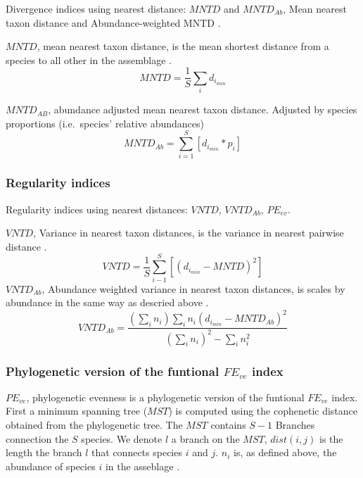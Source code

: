 \documentclass[]{book}
\theoremstyle{definition}
\theoremstyle{definition}
\theoremstyle{definition}
\theoremstyle{remark}
\begin{document}
Divergence indices using nearest distance: \(MNTD\) and \(MNTD_{Ab}\),
Mean nearest taxon distance and Abundance-weighted MNTD
\citep{Webb2002, Webb2008, Kembel2010}.

\(MNTD\), mean nearest taxon distance, is the mean shortest distance
from a species to all other in the assemblage
\citep{Webb2002, Webb2008, Kembel2010}.\\
\[
MNTD = 
\dfrac{1}{S}
\sum_{i}
d_{i_{min}}
\]

\(MNTD_{AB}\), abundance adjusted mean nearest taxon distance. Adjusted
by species proportions (i.e.~species' relative abundances)
\citep{Webb2002, Webb2008, Kembel2010}\\
\[
MNTD_{Ab} = 
\sum_{i=1}^{S}
[d_{i_{min}} * p_{i}]
\]

\subsubsection{Regularity indices}\label{regularity-indices}

Regularity indices using nearest distances: \(VNTD\), \(VNTD_{Ab}\),
\(PE_{ev}\).

\(VNTD\), Variance in nearest taxon distances, is the variance in
nearest pairwise distance \citep{Tucker2016}. \[
VNTD = \dfrac{1}{S}
\sum_{i-1}^{S}
[(d_{i_{min}} - MNTD)^2]
\] \(VNTD_{Ab}\), Abundance weighted variance in nearest taxon
distances, is scales by abundance in the same way as descried above
\citep{Tucker2016}. \[
VNTD_{Ab} = \dfrac
{(\sum_{i} n_{i}) \sum_{i} n_{i} (d_{i_{min}} - MNTD_{Ab})^2}
{(\sum_{i} n_{i})^2 - \sum_{i} n_{i} ^2}
\]

\subsubsection{\texorpdfstring{Phylogenetic version of the funtional
\(FE_{ve}\)
index}{Phylogenetic version of the funtional FE\_\{ve\} index}}\label{phylogenetic-version-of-the-funtional-fe_ve-index}

\(PE_{ve}\), phylogenetic evenness is a phylogenetic version of the
funtional \(FE_{ve}\) index. First a minimum spanning tree (\(MST\)) is
computed using the cophenetic distance obtained from the phylogenetic
tree. The \(MST\) contains \(S-1\) Branches connection the \(S\)
species. We denote \(l\) a branch on the \(MST\), \(dist(i,j)\) is the
length the branch \(l\) that connects species \(i\) and \(j\). \(n_{i}\)
is, as defined above, the abundance of species \(i\) in the asseblage
\citep{Villeger2008, Dehling2014}.
\end{document}
